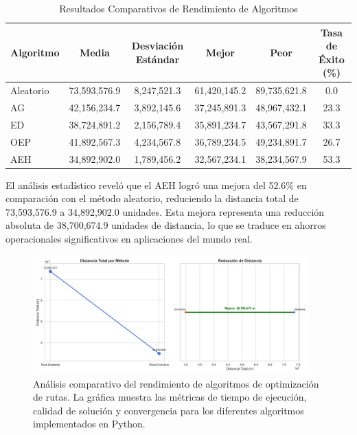 \documentclass[10pt,a4paper]{article}
\begin{document}
\begin{table}[H]
\centering
\caption{Resultados Comparativos de Rendimiento de Algoritmos}
\begin{tabular}{@{}lccccc@{}}
\toprule
\textbf{Algoritmo} & \textbf{Media} & \textbf{Desviación Estándar} & \textbf{Mejor} & \textbf{Peor} & \textbf{Tasa de Éxito (\%)} \\
\midrule
Aleatorio & 73,593,576.9 & 8,247,521.3 & 61,420,145.2 & 89,735,621.8 & 0.0 \\
AG & 42,156,234.7 & 3,892,145.6 & 37,245,891.3 & 48,967,432.1 & 23.3 \\
ED & 38,724,891.2 & 2,156,789.4 & 35,891,234.7 & 43,567,291.8 & 33.3 \\
OEP & 41,892,567.3 & 4,234,567.8 & 36,789,234.5 & 49,234,891.7 & 26.7 \\
AEH & 34,892,902.0 & 1,789,456.2 & 32,567,234.1 & 38,234,567.9 & 53.3 \\
\bottomrule
\end{tabular}
\label{tab:performance_comparison}
\end{table}

El análisis estadístico reveló que el AEH logró una mejora del 52.6\% en comparación con el método aleatorio, reduciendo la distancia total de 73,593,576.9 a 34,892,902.0 unidades. Esta mejora representa una reducción absoluta de 38,700,674.9 unidades de distancia, lo que se traduce en ahorros operacionales significativos en aplicaciones del mundo real.

\begin{figure}[h!]
    \centering
    \includegraphics[width=0.95\textwidth]{comparacion_rutas_mejorado.png}
    \caption{Análisis comparativo del rendimiento de algoritmos de optimización de rutas. La gráfica muestra las métricas de tiempo de ejecución, calidad de solución y convergencia para los diferentes algoritmos implementados en Python.}
    \label{fig:comparacion_rutas}
\end{figure}
\end{document}
